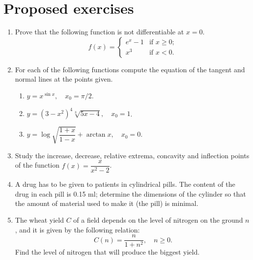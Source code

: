 \section{Proposed exercises}
\begin{enumerate}[leftmargin=*]
\item Prove that the following function is not differentiable at $x=0$.
\[
f(x)=
\begin{cases}
e^x-1 & \mbox{if $x\geq 0$};  \\
x^3 & \mbox{if $x<0$}.
\end{cases}
\]

\item For each of the following functions compute the equation of the tangent and normal lines at the points given.
\begin{enumerate}
\item  $y=x^{\sin x},\quad x_{0}=\pi/2$.
\item  $y=(3-x^2)^4\sqrt[3]{5x-4},\quad x_{0}=1$.
\item  $y=\log \sqrt{\dfrac{1+x}{1-x}}+\arctan x, \quad x_{0}=0$.
\end{enumerate}

\item Study the increase, decrease, relative extrema, concavity and inflection points of the function $f(x)=\dfrac{x}{x^2-2}$.

\item A drug has to be given to patients in cylindrical pills.
The content of the drug in each pill is 0.15 ml; determine the dimensions of the cylinder so that the amount of material used to make it (the pill) is minimal.

\item The wheat yield $C$ of a field depends on the level of nitrogen on the ground $n$, and it is given by the following relation:
\[
C(n) = \frac{n}{1+n^2},\quad n\geq 0.
\]
Find the level of nitrogen that will produce the biggest yield.
\end{enumerate}
